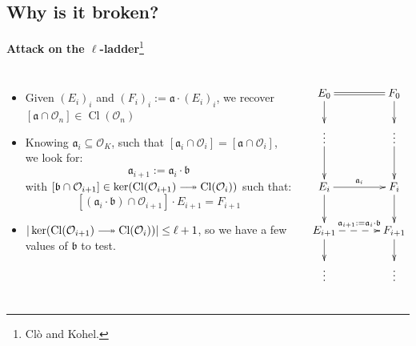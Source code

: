 \documentclass[10pt]{beamer}
\theoremstyle{plain}
\theoremstyle{definition}
\newcommand{\mO}{\mathcal{O}}
\renewcommand{\(}{\left(}
\renewcommand{\)}{\right)}
\newcommand{\mf}[1]{\mathfrak{#1}}
\DeclareMathOperator{\Cl}{Cl}
\begin{document}
\subsection{Why is it broken?}

\begin{frame}
\textbf{Attack on the $\ell$-ladder}\footnote[frame]{Cl\`{o} and Kohel.}

\begin{columns}[t]

\begin{itemize}
\item Given $(E_i)_{i}$ and $(F_i)_i:=\mf{a}\cdot (E_i)_i$, we recover $[\mf{a}\cap\mO_n]\in\Cl(\mO_n)$

\item Knowing $\mf{a}_i\subseteq \mO_K$, such that $[\mf{a}_i\cap\mO_i]=[\mf{a}\cap \mO_i]$, we look for:
\[\mf{a}_{i+1}:=\mf{a}_i\cdot \mf{b}\]
with $[\mf{b}\cap\mO_{i+1}]\in\ker(\Cl(\mO_{i+1})\relbar\joinrel\twoheadrightarrow\Cl(\mO_{i}))$ such that:
\[[(\mf{a}_i\cdot \mf{b})\cap\mO_{i+1}]\cdot E_{i+1}=F_{i+1}\]

\item $|\ker(\Cl(\mO_{i+1})\relbar\joinrel\twoheadrightarrow\Cl(\mO_{i}))|\leq\ell+1$, so we have a few values of $\mf{b}$ to test.
\end{itemize}

\[\xymatrix@C+1pc{
E_0 \ar[d] \ar@2{-}[r]& F_0\ar[d]\\
\vdots \ar[d] & \vdots \ar[d]\\
E_i \ar[d] \ar[r]^{\mf{a}_i} & F_i\ar[d]\\
E_{i+1} \ar[d] \ar@{-->}[r]^{\mf{a}_{i+1}:=\mf{a}_i\cdot\mf{b}} & F_{i+1}\ar[d]\\
\vdots & \vdots\\
}\]
\end{columns}

\end{frame}





\end{document}
